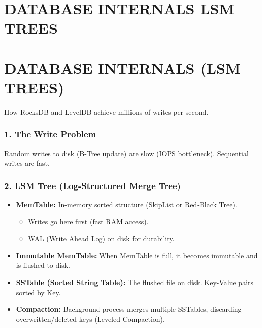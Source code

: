 \hypertarget{database-internals-lsm-trees}{%
\chapter{DATABASE INTERNALS LSM
TREES}\label{database-internals-lsm-trees}}

\hypertarget{database-internals-lsm-trees-1}{%
\chapter{DATABASE INTERNALS (LSM
TREES)}\label{database-internals-lsm-trees-1}}

How RocksDB and LevelDB achieve millions of writes per second.

\hypertarget{the-write-problem}{%
\subsection{1. The Write Problem}\label{the-write-problem}}

Random writes to disk (B-Tree update) are slow (IOPS bottleneck).
Sequential writes are fast.

\hypertarget{lsm-tree-log-structured-merge-tree}{%
\subsection{2. LSM Tree (Log-Structured Merge
Tree)}\label{lsm-tree-log-structured-merge-tree}}

\begin{itemize}
\tightlist
\item
  \textbf{MemTable:} In-memory sorted structure (SkipList or Red-Black
  Tree).

  \begin{itemize}
  \tightlist
  \item
    Writes go here first (fast RAM access).
  \item
    WAL (Write Ahead Log) on disk for durability.
  \end{itemize}
\item
  \textbf{Immutable MemTable:} When MemTable is full, it becomes
  immutable and is flushed to disk.
\item
  \textbf{SSTable (Sorted String Table):} The flushed file on disk.
  Key-Value pairs sorted by Key.
\item
  \textbf{Compaction:} Background process merges multiple SSTables,
  discarding overwritten/deleted keys (Leveled Compaction).
\end{itemize}

